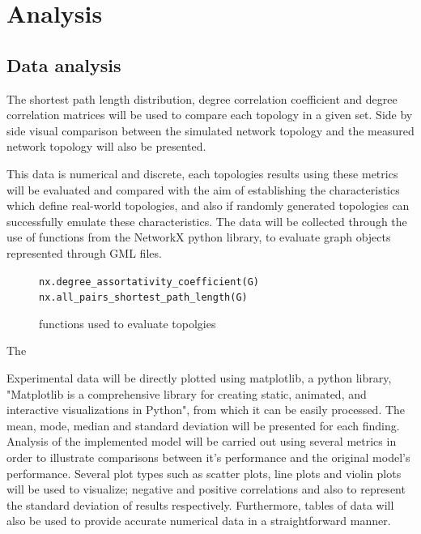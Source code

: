 \section{Analysis}



\subsection{Data analysis}

The shortest path length distribution, degree correlation coefficient and degree correlation matrices will be used to compare each topology in a given set. 
Side by side visual comparison between the simulated network topology and the measured network topology will also be presented. 

This data is numerical and discrete, each topologies results using these metrics will be evaluated and compared with the aim of establishing the characteristics which define real-world topologies, and also if randomly generated topologies can successfully emulate these characteristics. The data will be collected through the use of functions from the NetworkX python library, to evaluate graph objects represented through GML files. 

\begin{figure}
    \centering
    \verb|nx.degree_assortativity_coefficient(G)| \verb|nx.all_pairs_shortest_path_length(G)|
    \caption{functions used to evaluate topolgies}
    \label{fig:enter-label}
\end{figure}

The 

Experimental data will be directly plotted using matplotlib, a python library, "Matplotlib is a comprehensive library for creating static, animated, and interactive visualizations in Python"\cite{matplotlib},  from which it can be easily processed. The mean, mode, median and standard deviation will be presented for each finding. Analysis of the implemented model will be carried out using several metrics in order to illustrate comparisons between it's performance and the original model's performance. Several plot types such as scatter plots, line plots and violin plots will be used to visualize; negative and positive correlations and also to represent the standard deviation of results respectively. Furthermore, tables of data will also be used to provide accurate numerical data in a straightforward manner.

